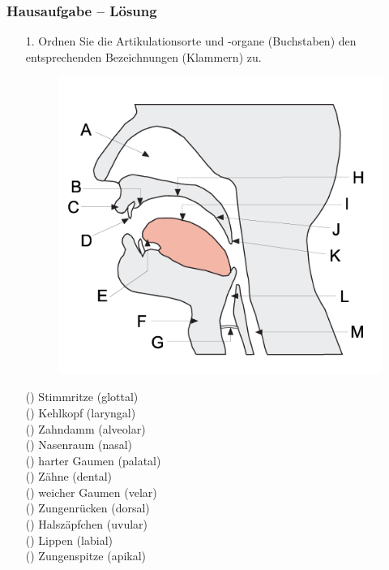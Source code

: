 
\begin{frame}
\frametitle{Hausaufgabe -- Lösung}
\begin{itemize}
	\item[1.] Ordnen Sie die Artikulationsorte und -organe (Buchstaben) den entsprechenden Bezeichnungen (Klammern) zu.
	
	\begin{minipage}{0.48\textwidth}
		\begin{figure}
			\centering
			\includegraphics[scale=0.33]{../material/04phonoatonomy}
		\end{figure}
	\end{minipage}
	\hfill
	\begin{minipage}{0.4\textwidth}
		
		() Stimmritze (glottal)\\
		() Kehlkopf (laryngal)\\
		() Zahndamm (alveolar)\\
		() Nasenraum (nasal)\\
		() harter Gaumen (palatal)\\
		() Zähne (dental)\\
		() weicher Gaumen (velar)\\
		() Zungenrücken (dorsal)\\
		() Halszäpfchen (uvular)\\
		() Lippen (labial)\\
		() Zungenspitze (apikal)
	\end{minipage}
	
\end{itemize}
\end{frame}


